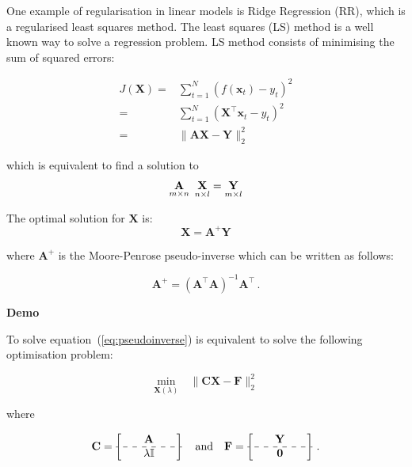 One example of regularisation in linear models is Ridge Regression (RR), which is a regularised least squares method.
The least squares (LS) method is a well known way to solve a regression
problem. 
LS method consists of minimising the sum of squared errors:

\begin{eqnarray*}
\label{eq:lsm}
 J(\mathbf{X}) =& \displaystyle \sum_{t=1}^N (f(\mathbf{x}_t)-y_t)^2 \\
 =&\displaystyle \sum_{t=1}^N (\mathbf{\mathbf{X}}^\top {\mathbf{x}}_t-y_t)^2 \\
 =& \| \mathbf{A}\mathbf{\mathbf{X}} - \mathbf{Y} \|_2^2 
\end{eqnarray*}

\noindent which is equivalent to find a solution to 
\begin{equation}
\label{eq:regproblem}
\underset{m \times n}{\mathbf{A}} \enskip \underset{n \times
l}{\mathbf{\mathbf{X}}} = \underset{m \times l}{\mathbf{Y}}
\end{equation}

The optimal solution for $\mathbf{\mathbf{X}}$ is:
\begin{equation*}
\mathbf{\mathbf{X}}= \mathbf{A}^+ \mathbf{Y}
\end{equation*}


\noindent where $\mathbf{A}^+$ is the Moore-Penrose pseudo-inverse
which can be written as follows: 

\begin{equation}
\label{eq:pseudoinverse}
\mathbf{A}^+= (\mathbf{A}^\top \mathbf{A})^{-1}\mathbf{A}^\top \, .
\end{equation}

\textbf{Demo}\quad

To solve equation~(\ref{eq:pseudoinverse}) is equivalent to solve the following
optimisation problem:


\begin{equation}
\label{eq:RRproblem2}
\underset{\mathbf{X}(\lambda)}{\text{min}} \quad \|
\mathbf{C}\mathbf{\mathbf{X}} - \mathbf{F} \|_2^2
\end{equation}

\noindent where

\begin{equation*}
	\mathbf{C}=
	\begin{bmatrix} \quad &\mathbf{A}& \quad \\ \hdashline \quad
& \lambda\mathbb{I}&\quad  
\end{bmatrix} 
\quad \text{and} \quad
	\mathbf{F}=\begin{bmatrix} \quad &\mathbf{Y}& \quad \\ \hdashline \quad
& \mathbf{0}&\quad  \end{bmatrix} \, .
\end{equation*}

